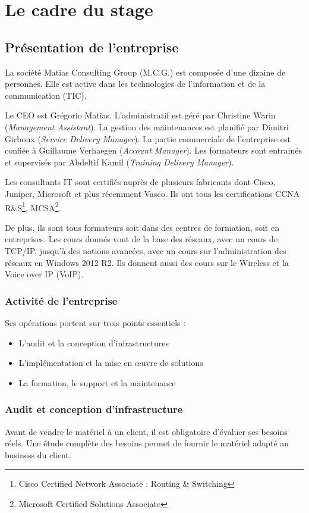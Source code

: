 \chapter{Le cadre du stage}
\section{Présentation de l'entreprise}
La société Matias Consulting Group (M.C.G.) est composée d'une dizaine de personnes. 
Elle est active dans les technologies de l'information et de la communication (TIC).

Le CEO est Grégorio Matias.
L'administratif est géré par Christine Warin (\textit{Management Assistant}).
La gestion des maintenances est planifié par Dimitri Girboux (\textit{Service Delivery Manager}).
La partie commerciale de l'entreprise est confiée à Guillaume Verhaegen (\textit{Account Manager}).
Les formateurs sont entrainés et supervisés par Abdeltif Kamil (\textit{Training Delivery Manager}).

Les consultants IT sont certifiés auprès de plusieurs fabricants dont Cisco, Juniper, Microsoft et plus récemment Vasco.
Ils ont tous les certifications CCNA R\&S\footnote{Cisco Certified Network Associate : Routing \& Switching}, MCSA\footnote{Microsoft Certified Solutions Associate}.

De plus, ils sont tous formateurs soit dans des centres de formation, soit en entreprises.
Les cours donnés vont de la base des réseaux, avec un cours de TCP/IP, jusqu'à des notions avancées, avec un cours sur l'administration des réseaux en Windows 2012 R2. 
Ils donnent aussi des cours sur le Wireless et la Voice over IP (VoIP).

\subsection{Activité de l'entreprise}

Ses opérations portent sur trois points essentiels : 
\begin{itemize}
	\item L'audit et la conception d'infrastructures
	\item L'implémentation et la mise en œuvre de solutions
	\item La formation, le support et la maintenance
\end{itemize}

\subsection*{Audit et conception d'infrastructure}
Avant de vendre le matériel à un client, il est obligatoire d'évaluer ses besoins réels.
Une étude complète des besoins permet de fournir le matériel adapté au business du client.



